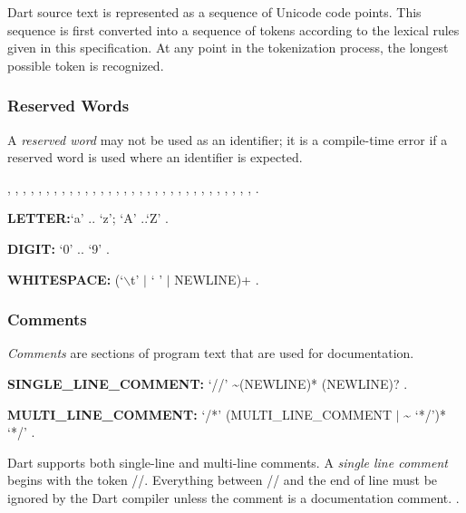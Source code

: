 \documentclass{article}
\newcommand{\code}[1]{{\sf #1}}
\begin{document}
\LMHash{}
Dart source text is represented as a sequence of Unicode code points.  This sequence is first converted into a sequence of tokens according to the lexical rules given in this specification.  At any point in the tokenization process, the longest possible token is recognized.

\subsubsection{Reserved Words}

\LMHash{}
A {\em reserved word} may not be used as an identifier; it is a compile-time error if a reserved word is used where an identifier is expected.

\ASSERT{}, \BREAK{}, \CASE{}, \CATCH{}, \CLASS{}, \CONST{}, \CONTINUE{}, \DEFAULT{}, \DO{}, \ELSE{}, \ENUM{}, \EXTENDS{}, \FALSE{}, \FINAL{}, \FINALLY{}, \FOR{}, \IF{}, \IN{}, \IS{}, \NEW{}, \NULL{}, \RETHROW, \RETURN{}, \SUPER{}, \SWITCH{}, \THIS{}, \THROW{}, \TRUE{}, \TRY{}, \VAR{}, \VOID{}, \WHILE{}, \WITH{}.




\begin{grammar}
 {\bf LETTER:}`a' {\escapegrammar ..} `z';
     `A' {\escapegrammar ..}`Z'
    .

{\bf DIGIT:}
      `0' {\escapegrammar ..} `9'
    .

{\bf WHITESPACE:}
      (`$\backslash$t' $|$ ` ' $|$ NEWLINE)+
    .
\end{grammar}

\subsubsection{Comments}

\LMHash{}
{\em Comments} are sections of program text that are used for documentation.

\begin{grammar}{\bf SINGLE\_LINE\_COMMENT:}
      `//' \~{}(NEWLINE)* (NEWLINE)?
    .

{\bf MULTI\_LINE\_COMMENT:}
      `/*' (MULTI\_LINE\_COMMENT $|$ \~{} `*/')* `*/'
    .
 \end{grammar}

\LMHash{}
Dart supports both single-line and multi-line comments. A {\em single line comment} begins with the token \code{//}. Everything between \code{//} and the end of line must be ignored by the Dart compiler unless the comment is a documentation comment. .
\end{document}
